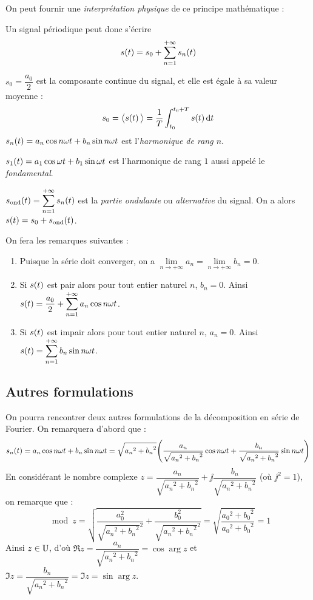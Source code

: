\documentclass[a4paper,french,bookmarks]{book}
\begin{document}
    On peut fournir une \textit{interprétation physique} de ce principe mathématique :
    \begin{enumerate}
        \itt Un signal périodique peut donc s'écrire
        \[ s\!\left(t\right) = s_0 + \sum_{n=1}^{+\infty} s_n\!\left(t\right)\]
        
        \itt $s_0 = \dfrac{a_0}{2}$ est la composante continue du signal, et elle est égale à sa valeur moyenne :
        \[ s_0 = \big\langle s\!\left(t\right)\big\rangle = \dfrac{1}{T}\int_{t_0}^{t_0 + T}s\!\left(t\right)\mathrm d t\]
        \itt $s_n\!\left(t\right) = a_n\cos{n\omega t} + b_n\sin{n\omega t}$ est l'\textit{harmonique de rang $n$}.
        
        \itt $s_1\!\left(t\right) = a_1\cos{\omega t} + b_1\sin{\omega t}$ est l'harmonique de rang $1$ aussi appelé le \textit{fondamental}.
        
        \itt $s_\text{ond}\!\left(t\right) = \displaystyle \sum_{n=1}^{+\infty} s_n\!\left(t\right)$ est la \textit{partie ondulante} ou \textit{alternative} du signal. On a alors $s\!\left(t\right) = s_0 + s_\text{ond}\!\left(t\right)$.
    \end{enumerate}
    
    On fera les remarques suivantes :
    \begin{enumerate}
        \item Puisque la série doit converger, on a $\lim\limits_{n \to +\infty} a_n = \lim\limits_{n \to +\infty} b_n = 0$.
        
        \item Si $s\!\left(t\right)$ est pair alors pour tout entier naturel $n$, $b_n = 0$. Ainsi $s\!\left(t\right) = \dfrac{a_0}{2} + \displaystyle\sum_{n=1}^{+\infty} a_n\cos{n\omega t}$.
        
        \item Si $s\!\left(t\right)$ est impair alors pour tout entier naturel $n$, $a_n = 0$. Ainsi $s\!\left(t\right) = \displaystyle\sum_{n=1}^{+\infty} b_n\sin{n\omega t}$.
    \end{enumerate}
    
    \subsection{Autres formulations}
    
    On pourra rencontrer deux autres formulations de la décomposition en série de Fourier. On remarquera d'abord que :
    \[ s_n\!\left(t\right) = a_n\cos{n\omega t} + b_n\sin{n\omega t} = \sqrt{{a_n}^2 + {b_n}^2}\!\left(\dfrac{a_n}{\sqrt{{a_n}^2 + {b_n}^2}}\cos{n\omega t} + \dfrac{b_n}{\sqrt{{a_n}^2 + {b_n}^2}}\sin{n\omega t}\right)\]
    En considérant le nombre complexe $z = \dfrac{a_n}{\sqrt{{a_n}^2 + {b_n}^2}} + \jj\dfrac{b_n}{\sqrt{{a_n}^2 + {b_n}^2}}$ (où $\jj^2 = 1$), on remarque que :
    \[ \mod{z} = \sqrt{\dfrac{a_0^2}{\sqrt{{a_n}^2 + {b_n}^2}^2} + \dfrac{b_0^2}{\sqrt{{a_n}^2 + {b_n}^2}^2}} = \sqrt{\dfrac{{a_0}^2 + {b_0}^2}{{a_0}^2 + {b_0}^2}} = 1\]
    Ainsi $z \in \mathbb{U}$, d'où $\Re{z} = \dfrac{a_n}{\sqrt{{a_n}^2 + {b_n}^2}} = \cos{\arg z}$ et $\Im{z} = \dfrac{b_n}{\sqrt{{a_n}^2 + {b_n}^2}} = \Im{z} = \sin{\arg z}$.
    
\end{document}
